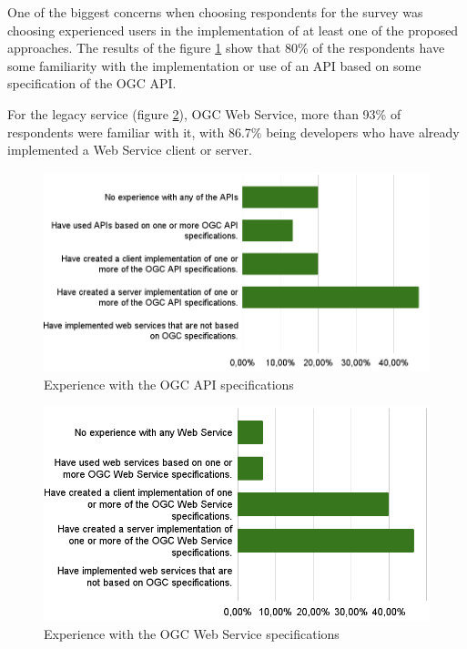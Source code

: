 One of the biggest concerns when choosing respondents for the survey was choosing experienced users in the implementation of at least one of the proposed approaches. The results of the figure \ref{fig:apixp} show that 80\% of the respondents have some familiarity with the implementation or use of an API based on some specification of the OGC API. 

For the legacy service (figure \ref{fig:wsxp}), OGC Web Service, more than 93\% of respondents were familiar with it, with 86.7\% being developers who have already implemented a Web Service client or server. 

\begin{figure}[H]
     \centering
     \includegraphics[scale=0.5]{img/apixp.png}
     \caption{Experience with the OGC API specifications }
     \label{fig:apixp}
\end{figure}

\begin{figure}[H]
     \centering
     \includegraphics[scale=0.55]{img/wsxp.png}
     \caption{Experience with the OGC Web Service specifications }
     \label{fig:wsxp}
\end{figure}

